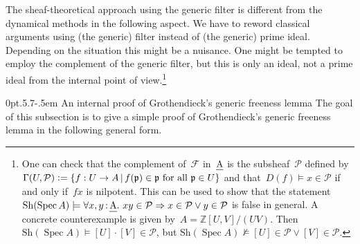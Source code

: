 \documentclass[10pt,reqno,a4paper]{amsbook}
\makeatletter
\theoremstyle{definition}
\theoremstyle{plain}
\theoremstyle{remark}
\newcommand{\ZZ}{\mathbb{Z}}
\newcommand{\F}{\mathcal{F}}
\renewcommand{\P}{\mathcal{P}}
\newcommand{\ppp}{\mathfrak{p}}
\let\oldul\ul
\renewcommand{\ul}[1]{\text{\oldul{$#1$}}}
\newcommand{\Sh}{\mathrm{Sh}}
\DeclareMathOperator{\Spec}{Spec}
\newcommand{\?}{\,{:}\,}
\renewcommand{\_}{\mathpunct{.}\,}
\newcommand{\defeq}{\vcentcolon=}
\def\subsection{\@startsection{subsection}{2}%
  {0pt}{.5\linespacing\@plus.7\linespacing}{-.5em}%
  {\normalfont\bfseries}}
\makeatother
\begin{document}
The sheaf-theoretical approach using the generic filter is different from the
dynamical methods in the following aspect. We have to reword classical
arguments using (the generic) filter instead of (the generic) prime ideal.
Depending on the situation this might be a nuisance. One might be tempted to
employ the complement of the generic filter, but this is only an ideal, not a
prime ideal from the internal point of view.\footnote{One can check that the
complement of~$\F$ in~$\ul{A}$ is the subsheaf~$\P$ defined by~$\Gamma(U, \P)
\defeq \{ f : U \to A \,|\, \text{$f(\ppp) \in \ppp$ for all~$\ppp \in U$} \}$
and that~$D(f) \models x \in \P$ if and only if~$fx$ is nilpotent. This can be
used to show that the statement~$\Sh(\Spec A) \models \forall x,y\?\ul{A}\_ xy
\in \P \Rightarrow x \in \P \vee y \in \P$ is false in general. A concrete
counterexample is given by~$A = \ZZ[U,V]/(UV)$. Then~$\Sh(\Spec A) \models [U]
\cdot [V] \in \P$, but $\Sh(\Spec A) \not\models [U] \in \P \vee [V] \in \P$.}


\subsection{An internal proof of Grothendieck's generic freeness lemma}\label{sect:generic-freeness}
The goal of this subsection is to give a simple proof of Grothendieck's generic
freeness lemma in the following general form.
\end{document}
